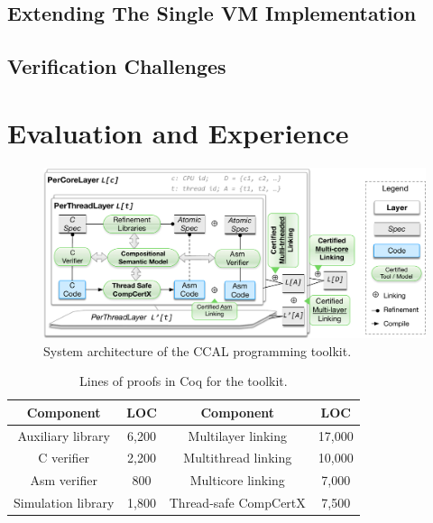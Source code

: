 \subsection{Extending The Single VM Implementation}

\subsection{Verification Challenges}

\section{Evaluation and Experience}
\label{sec:kernel}

\begin{figure}[t]
\centering
\includegraphics[scale=.45]{figs/tool_chain}
\caption{System architecture of the CCAL programming toolkit.}
\label{fig:toolchain}
\end{figure}

\begin{table}
\begin{center}
\begin{footnotesize}
\renewcommand{\arraystretch}{1} 
\begin{tabular}{|c|c||c|c|}
\hline
Component & LOC & Component & LOC \\
\hline
\hline
Auxiliary library & 6,200 & Multilayer linking & 17,000 \\
\hline
C verifier & 2,200 & Multithread linking & 10,000 \\
\hline
Asm verifier & 800 & Multicore linking & 7,000 \\
\hline
Simulation library & 1,800 & Thread-safe CompCertX & 7,500\\
\hline
\end{tabular}
\end{footnotesize}
\end{center}
\caption{Lines of proofs in Coq for the toolkit.}
\label{table:toolkit}
\end{table}

